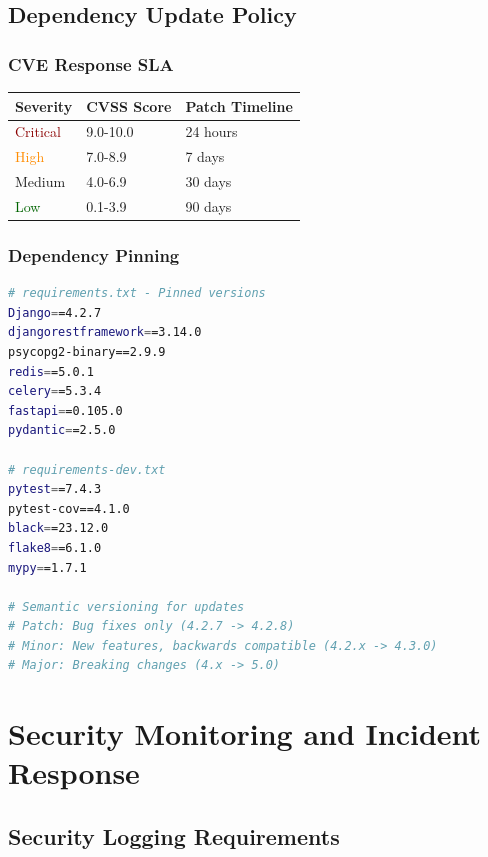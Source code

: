 \documentclass{report}
\begin{document}
\section{Dependency Update Policy}

\subsection{CVE Response SLA}
\begin{table}[h]
\centering
\small
\begin{tabular}{|l|l|l|}
\hline
\textbf{Severity} & \textbf{CVSS Score} & \textbf{Patch Timeline} \\
\hline
\textcolor{darkred}{Critical} & 9.0-10.0 & 24 hours \\
\hline
\textcolor{darkorange}{High} & 7.0-8.9 & 7 days \\
\hline
\textcolor{darkyellow}{Medium} & 4.0-6.9 & 30 days \\
\hline
\textcolor{darkgreen}{Low} & 0.1-3.9 & 90 days \\
\hline
\end{tabular}
\end{table}

\subsection{Dependency Pinning}
\begin{lstlisting}[language=bash]
# requirements.txt - Pinned versions
Django==4.2.7
djangorestframework==3.14.0
psycopg2-binary==2.9.9
redis==5.0.1
celery==5.3.4
fastapi==0.105.0
pydantic==2.5.0

# requirements-dev.txt
pytest==7.4.3
pytest-cov==4.1.0
black==23.12.0
flake8==6.1.0
mypy==1.7.1

# Semantic versioning for updates
# Patch: Bug fixes only (4.2.7 -> 4.2.8)
# Minor: New features, backwards compatible (4.2.x -> 4.3.0)
# Major: Breaking changes (4.x -> 5.0)
\end{lstlisting}


\chapter{Security Monitoring and Incident Response}

\section{Security Logging Requirements}
\end{document}
